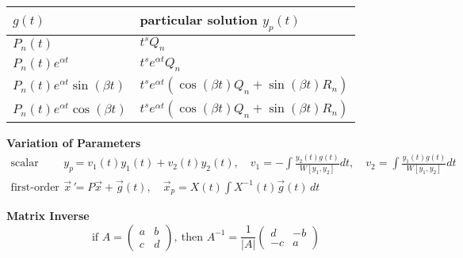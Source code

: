 \begin{center}
    \vspace{-0.4cm}
    \setlength{\extrarowheight}{0.25cm}
    \begin{tabular}{ p{3.9cm} p{4.8cm} }
        $g(t)$ &  particular solution $y_p(t)$ 
        \\[2pt] \hline $P_n(t)$  & $t^s Q_n$   \\        
        $P_n(t)e^{\alpha t}$ &  $t^s e^{\alpha t}Q_n$\\       
        $P_n(t)e^{\alpha t}\sin(\beta t)$ & $t^s e^{\alpha t} \left(\cos(\beta t)Q_n+\sin(\beta t) R_n\right)$\\
        $P_n(t)e^{\alpha t}\cos(\beta t)$ & $t^s e^{\alpha t} \left(\cos(\beta t)Q_n+\sin(\beta t) R_n\right)$\\[2pt] \hline
    \end{tabular}
    \setlength{\extrarowheight}{0.0cm}

    \vspace{12pt}
    \textbf{Variation of Parameters}    
    \begin{align*}
        \text{scalar form: } y_p &= v_1 (t) y_1(t) + v_2(t) y_2(t) , \quad 
        v_1 = - \int \frac{y_2(t)g(t)}{W[y_1,y_2]}dt , \quad 
        v_2 = \int \frac{y_1(t)g(t)}{W[y_1,y_2]} dt \\
        \text{first-order system: }\vec x \, ' &= P \vec x + \vec g(t), \quad \vec x_p = X(t) \int X^{-1}(t) \vec g(t) \, dt
    \end{align*}        
    
    \vspace{12pt}
    \textbf{Matrix Inverse}  
    $$\text{if } A= \begin{pmatrix} a& b\\c&d\end{pmatrix}, \ \text{then } A^{-1} = \frac{1}{|A|}\begin{pmatrix} d&-b\\-c&a\end{pmatrix}$$
\end{center}

\newpage